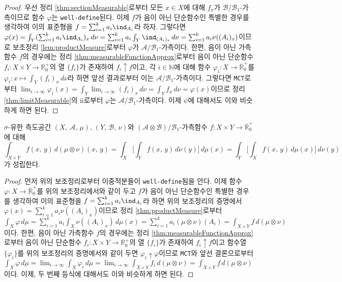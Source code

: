 \begin{proof}
    우선 정리 \ref{thm:sectionMeasurable}로부터 모든 $x\in X$에 대해 $f_x$가 $\mathcal{B}/\mathcal{B}_1$-가측이므로 함수 $\varphi$는 \texttt{well-define}된다. 이제 $f$가 음이 아닌 단순함수인 특별한 경우를 생각하여 이의 표준형을 $f=\sum_{i=1}^ka_i\ind_{A_i}$라 하자. 그렇다면 $\varphi(x)=\int_Y(\sum_{i=1}^ka_i\ind_{A_i})_x\,d\nu=\sum_{i=1}^ka_i\int_Y\ind_{(A_i)_x}\,d\nu=\sum_{i=1}^ka_i\nu((A_i)_x)$이므로 보조정리 \ref{lem:productMeasure}로부터 $\varphi$가 $\mathcal{A}/\mathcal{B}_1$-가측이다. 한편, 음이 아닌 가측함수 $f$의 경우에는 정리 \ref{thm:measurableFunctionApprox}로부터 음이 아닌 단순함수 $f_i:X\times Y\to\mathbb{R}^+_0$의 열 $\{f_i\}$가 존재하여 $f_i\uparrow f$이고, 각 $i\in\mathbb{N}$에 대해 함수 $\varphi_i:X\to\overline{\mathbb{R}}^+_0$를 $\varphi_i:x\mapsto\int_Y(f_i)_x\,d\nu$라 하면 앞선 결과로부터 이는 $\mathcal{A}/\mathcal{B}_1$-가측이다. 그렇다면 \texttt{MCT}로부터 $\lim_{i\to\infty}\varphi_i(x)=\int_Y\lim_{i\to\infty}(f_i)_x\,d\nu=\int_Yf_x\,d\nu=\varphi(x)$이므로 정리 \ref{thm:limitMeasurable}의 ii로부터 $\varphi$는 $\mathcal{A}/\mathcal{B}_1$-가측이다. 이제 $\psi$에 대해서도 이와 비슷하게 하면 된다.
\end{proof}

\begin{theorem}[Fubini]
    $\sigma$-유한 측도공간 $(X,\,\mathcal{A},\,\mu),\,(Y,\,\mathcal{B},\,\nu)$와 $(\mathcal{A}\otimes\mathcal{B})/\mathcal{B}_1$-가측함수 $f:X\times Y\to\overline{\mathbb{R}}^+_0$에 대해
    \begin{equation*}
        \int_{X\times Y}f(x,\,y)\,d(\mu\otimes\nu)(x,\,y)=\int_X\bigg[\int_Yf(x,\,y)\,d\nu(y)\bigg]\,d\mu(x)=\int_Y\bigg[\int_Xf(x,\,y)\,d\mu(x)\bigg]\,d\nu(y)
    \end{equation*}
    가 성립한다.
\end{theorem}

\begin{proof}
    먼저 위의 보조정리로부터 이중적분들이 \texttt{well-define}됨을 안다. 이제 함수 $\varphi:X\to\overline{\mathbb{R}}^+_0$를 위의 보조정리에서와 같이 두고 $f$가 음이 아닌 단순함수인 특별한 경우를 생각하여 이의 표준형을 $f=\sum_{i=1}^ka_i\ind_{A_i}$라 하면 위의 보조정리의 증명에서 $\varphi(x)=\sum_{i=1}^ka_i\nu((A_i)_x)$이므로 정리 \ref{thm:productMeasure}로부터 $\int_X\varphi\,d\mu=\sum_{i=1}^ka_i\int_X\nu((A_i)_x)\,d\mu(x)=\sum_{i=1}^ka_i(\mu\otimes\nu)(A_i)=\int_{X\times Y}f\,d(\mu\otimes\nu)$이다. 한편, 음이 아닌 가측함수 $f$의 경우에는 정리 \ref{thm:measurableFunctionApprox}로부터 음이 아닌 단순함수 $f_i:X\times Y\to\mathbb{R}^+_0$의 열 $\{f_i\}$가 존재하여 $f_i\uparrow f$이고 함수열 $\{\varphi_i\}$를 위의 보조정리의 증명에서와 같이 두면 $\varphi_i\uparrow\varphi$이므로 \texttt{MCT}와 앞선 결론으로부터 $\int_X\varphi\,d\mu=\lim_{i\to\infty}\int_X\varphi_i\,d\mu=\lim_{i\to\infty}\int_{X\times Y}f_i\,d(\mu\otimes\nu)=\int_{X\times Y}f\,d(\mu\otimes\nu)$이다. 이제, 두 번째 등식에 대해서도 이와 비슷하게 하면 된다.
\end{proof}

